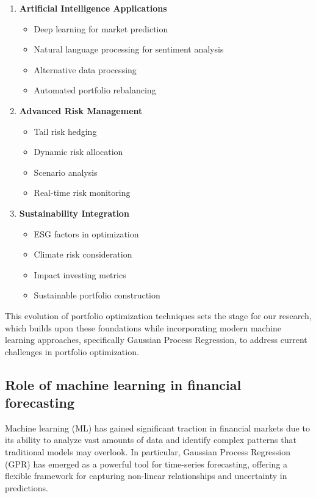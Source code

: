 \begin{enumerate}
    \item \textbf{Artificial Intelligence Applications}
    \begin{itemize}
        \item Deep learning for market prediction
        \item Natural language processing for sentiment analysis
        \item Alternative data processing
        \item Automated portfolio rebalancing
    \end{itemize}

    \item \textbf{Advanced Risk Management}
    \begin{itemize}
        \item Tail risk hedging
        \item Dynamic risk allocation
        \item Scenario analysis
        \item Real-time risk monitoring
    \end{itemize}

    \item \textbf{Sustainability Integration}
    \begin{itemize}
        \item ESG factors in optimization
        \item Climate risk consideration
        \item Impact investing metrics
        \item Sustainable portfolio construction
    \end{itemize}
\end{enumerate}

This evolution of portfolio optimization techniques sets the stage for our research, which builds upon these foundations while incorporating modern machine learning approaches, specifically Gaussian Process Regression, to address current challenges in portfolio optimization.


\subsection{Role of machine learning in financial forecasting}
Machine learning (ML) has gained significant traction in financial markets due to its ability to analyze vast amounts of data and identify complex patterns that traditional models may overlook.
In particular, Gaussian Process Regression (GPR) has emerged as a powerful tool for time-series forecasting, offering a flexible framework for capturing non-linear relationships and uncertainty in predictions.

